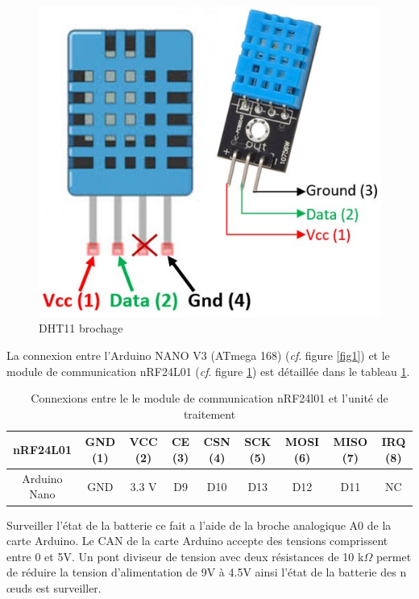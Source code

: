 \documentclass[a4paper,10pt]{article}
\begin{document}
\begin{figure}[h]
		\centering
	\includegraphics[scale=.49]{figures/dht.jpg}
		\caption{DHT11 brochage}
		\label{fig2}

\end{figure}

La connexion entre l'Arduino NANO V3 (ATmega 168) (\textit{cf}. figure \ref{fig1}) et le module de communication nRF24L01 (\textit{cf}. figure \ref{fig2}) est détaillée dans le tableau \ref{tab2}.
\begin{table}[!h]
	\centering
	\begin{tabular}{|c|c|c|c|c|c|c|c|c|}
		\hline 
	nRF24L01 & GND (1) & VCC (2)& CE (3) & CSN (4) 	& SCK (5) 	& MOSI (6) 	& MISO (7) 	& IRQ (8) \\ 
		\hline 
	Arduino Nano & GND 	& 3.3 V	& D9 & D10	& D13 & D12	& D11 & NC\\ 
		\hline 
	\end{tabular}
	\caption{Connexions entre le le module de communication nRF24l01 et l'unité de traitement} \label{tab2} 	
\end{table}

Surveiller l'état de la batterie ce fait a l'aide de la broche analogique A0 de la carte Arduino. Le CAN de la carte Arduino accepte des tensions comprissent entre 0 et 5V. Un pont diviseur de tension avec deux résistances de 10 k$\Omega$ permet de réduire la tension d'alimentation de 9V à 4.5V ainsi l'état de la batterie des n \oe uds est surveiller. 
\end{document}
